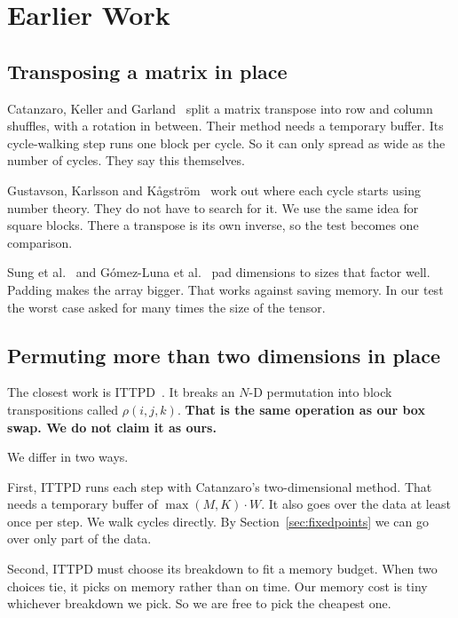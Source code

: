 \section{Earlier Work}
\label{sec:related}

\subsection{Transposing a matrix in place}

Catanzaro, Keller and Garland~\cite{catanzaro2014decomposition} split a matrix
transpose into row and column shuffles, with a rotation in between. Their
method needs a temporary buffer. Its cycle-walking step runs one block per
cycle. So it can only spread as wide as the number of cycles. They say this
themselves.

Gustavson, Karlsson and K\aa{}gstr\"{o}m~\cite{gustavson2012cycleleader} work
out where each cycle starts using number theory. They do not have to search for
it. We use the same idea for square blocks. There a transpose is its own
inverse, so the test becomes one comparison.

Sung et al.~\cite{sung2012pttwac} and G\'{o}mez-Luna et
al.~\cite{gomezluna2016inplace} pad dimensions to sizes that factor well.
Padding makes the array bigger. That works against saving memory. In our test
the worst case asked for many times the size of the tensor.

\subsection{Permuting more than two dimensions in place}

The closest work is ITTPD~\cite{cheng2025ittpd}. It breaks an $N$-D permutation
into block transpositions called $\rho(i,j,k)$. \textbf{That is the same
operation as our box swap. We do not claim it as ours.}

We differ in two ways.

First, ITTPD runs each step with Catanzaro's two-dimensional method. That needs
a temporary buffer of $\max(M,K)\cdot W$. It also goes over the data at least
once per step. We walk cycles directly. By Section~\ref{sec:fixedpoints} we can
go over only part of the data.

Second, ITTPD must choose its breakdown to fit a memory budget. When two
choices tie, it picks on memory rather than on time. Our memory cost is tiny
whichever breakdown we pick. So we are free to pick the cheapest one.

